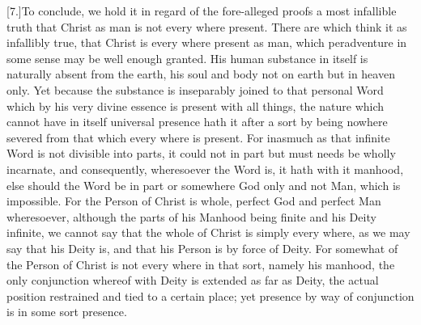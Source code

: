 [7.]To conclude, we hold it in regard of the fore-alleged proofs a most infallible truth that Christ as man is not every where present. There are which think it as infallibly true, that Christ is every where present as man, which peradventure in some sense may be well enough granted. His human substance in itself is naturally absent from the earth, his soul and body not on earth but in heaven only. Yet because the substance is inseparably joined to that personal Word which by his very divine essence is present with all things, the nature which cannot have in itself universal presence hath it after a  sort by being nowhere severed from that which every where is present.
 For inasmuch as that infinite Word is not divisible into parts, it could not in part but must needs be wholly incarnate, and consequently, wheresoever the Word is, it hath with it manhood, else should the Word be in part or somewhere God only and not Man, which is impossible. For the Person of Christ is whole, perfect God and perfect Man wheresoever, although the parts of his Manhood being finite and his Deity infinite, we cannot say that the whole of Christ is simply every where, as we may say that his Deity is, and that his Person is by force of Deity. For somewhat of the Person of Christ is not every where in that sort, namely his manhood, the only conjunction whereof with Deity is extended as far as Deity, the actual position restrained and tied to a certain place; yet presence by way of conjunction is in some sort presence.

